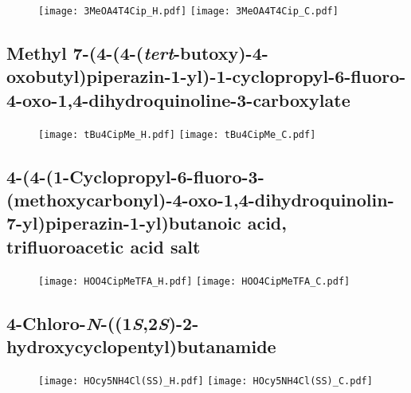 \begin{figure}[H]
	\centering
		\texttt{[image: 3MeOA4T4Cip\_H.pdf]}
		\texttt{[image: 3MeOA4T4Cip\_C.pdf]}
\end{figure}

\subsection{Methyl 7\hyp{}(4\hyp{}(4\hyp{}(\textit{tert}\hyp{}butoxy)\hyp{}4\hyp{}oxobutyl)piperazin\hyp{}1\hyp{}yl)\hyp{}1\hyp{}cyclopropyl\hyp{}6\hyp{}fluoro\hyp{}4\hyp{}oxo\hyp{}1,4\hyp{}dihydroquinoline\hyp{}3\hyp{}carboxylate }

\begin{figure}[H]
	\centering
		\texttt{[image: tBu4CipMe\_H.pdf]}
		\texttt{[image: tBu4CipMe\_C.pdf]}
\end{figure}

\subsection{4\hyp{}(4\hyp{}(1\hyp{}Cyclopropyl\hyp{}6\hyp{}fluoro\hyp{}3\hyp{}(methoxycarbonyl)\hyp{}4\hyp{}oxo\hyp{}1,4\hyp{}dihydroquinolin\hyp{}7\hyp{}yl)piperazin\hyp{}1\hyp{}yl)butanoic acid, trifluoroacetic acid salt }

\begin{figure}[H]
	\centering
		\texttt{[image: HOO4CipMeTFA\_H.pdf]}
		\texttt{[image: HOO4CipMeTFA\_C.pdf]}
\end{figure}

\subsection{4\hyp{}Chloro\hyp{}\textit{N}\hyp{}((1\textit{S},2\textit{S})\hyp{}2\hyp{}hydroxycyclopentyl)butanamide }

\begin{figure}[H]
	\centering
		\texttt{[image: HOcy5NH4Cl(SS)\_H.pdf]}
		\texttt{[image: HOcy5NH4Cl(SS)\_C.pdf]}
\end{figure}

